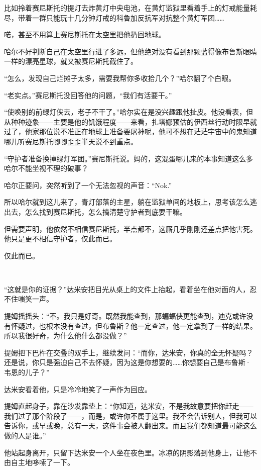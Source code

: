 \documentclass[../main]{subfiles}
\begin{document}
比如拎着赛尼斯托的提灯去炸黄灯中央电池，在黄灯监狱里看着手上的灯戒能量耗尽，带着一群只能玩十几分钟灯戒的科鲁加反抗军对抗整个黄灯军团……

喏，甚至不用算上赛尼斯托在太空里把他扔回地球。

哈尔不好判断自己在太空里行进了多远，但他绝对没有看到那颗蓝得像布鲁斯眼睛一样的漂亮星球，就又被赛尼斯托截住了。

“怎么，发现自己烂摊子太多，需要我帮你多收拾几个？”哈尔翻了个白眼。

“老实点。”赛尼斯托没回答他的问题，“我们有活要干。”

“使唤别的前绿灯侠去，老子不干了。”哈尔实在是没兴趣跟他扯皮。他没看表，但从种种迹象——主要是他的饥饿程度——来看，扎塔娜预估的伊西丝行动时限早就过了，他家那位说不准正在地球上准备要屠神呢，他可不想在茫茫宇宙中的鬼知道哪儿听赛尼斯托唧唧歪歪半天说不到重点。

“守护者准备换掉绿灯军团。”赛尼斯托说。妈的，这混蛋哪儿来的本事知道这么多哈尔不能坐视不理的破事？

哈尔正要问，突然听到了一个无法忽视的声音：“Nok.”

所以哈尔就到这儿来了，青灯部落的主星，躺在监狱单间的地板上，思考该怎么逃出去，怎么找到赛尼斯托，怎么搞清楚守护者到底要干嘛。

但需要声明，他依然不相信赛尼斯托，半点都不，这厮几乎刚刚还差点把他害死。他只是更不相信守护者，仅此而已。

仅此而已。

~\

“这就是你的证据？”达米安把目光从桌上的文件上抬起，看着坐在他对面的人，忍不住嗤笑一声。

提姆摇摇头：“不。我只是好奇。既然我能查到，那蝙蝠侠更能查到，迪克或许没有怀疑过，也根本没有查过，但布鲁斯？他一定查过，他一定拿到了一样的结果。所以我很好奇，为什么他什么都没做？”

提姆把下巴杵在交叠的双手上，继续发问：“而你，达米安，你真的全无怀疑吗？还是说，你只是强迫自己不去怀疑，因为这是你想要的……你想要自己是布鲁斯·韦恩的儿子？”

达米安看着他，只是冷冷地笑了一声作为回应。

提姆直起身子，靠在沙发靠垫上：“你知道，达米安，不是我故意要把你赶走——我们过了那个阶段了——，而是，或许你不属于这里。我不会告诉别人，但我可以告诉你，或早或晚，总有一天，这件事会被人翻出来。而且我们都知道最可能这么做的人是谁。”

他站起身离开，只留下达米安一个人坐在夜色里。冰凉的阴影落到他身上，让他不由自主地哆嗦了一下。

\end{document}
